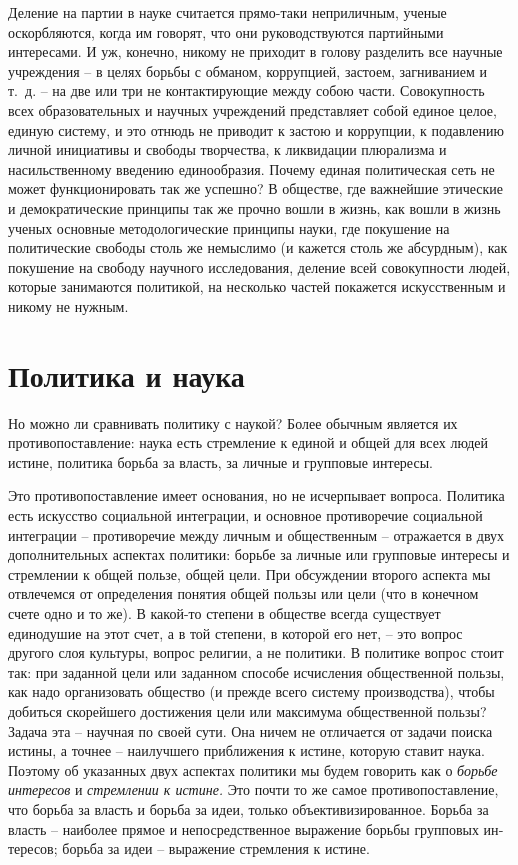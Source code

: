 \documentclass{book}
\begin{document}
Деление на партии в науке считается прямо-таки неприличным, ученые оскорбляются, когда им говорят, что они руководству­ются партийными интересами. И уж, конечно, никому не приходит в голову разделить все научные учреждения -- в целях борьбы с обманом, коррупцией, застоем, загниванием и т.~д. -- на две или три не контактирующие между собою части. Совокупность всех образовательных и научных учреждений пред­ставляет собой единое целое, единую систему, и это отнюдь не приводит к застою и коррупции, к подавлению личной ини­циативы и свободы творчества, к ликвидации плюрализма и насильственному введению единообразия. Почему единая поли­тическая сеть не может функционировать так же успешно? В обществе, где важнейшие этические и демократические прин­ципы так же прочно вошли в жизнь, как вошли в жизнь ученых основные методологические принципы науки, где покушение на политические свободы столь же немыслимо (и кажется столь же абсурдным), как покушение на свободу научного ис­следования, деление всей совокупности людей, 
которые занима­ются политикой, на несколько частей покажется искусственным и никому не нужным.



\section{Политика и наука}

Но можно ли сравнивать политику с наукой? Более обычным является их противопоставление: наука есть стремление к единой и общей для всех людей истине, политика борьба за власть, за личные и групповые интересы.

Это противопоставление имеет основания, но не исчерпывает вопроса. Политика есть искусство социальной интеграции, и основное противоречие социальной интеграции -- противоречие между личным и общественным -- отражается в двух дополнительных аспектах политики: борьбе за личные или групповые интересы и стремлении к общей пользе, общей цели. При обсуждении второго аспекта мы отвлечемся от определения понятия общей пользы или цели (что в конечном счете одно и то же). В какой-то степени в обществе всегда существует единодушие на этот счет, а в той степени, в которой его нет, -- это вопрос другого слоя культуры, вопрос религии, а не политики. В политике вопрос стоит так: при заданной цели или заданном способе исчисления общественной пользы, как надо организовать общество (и прежде всего систему производства), чтобы добиться скорейшего достижения цели или максимума общественной пользы? Задача эта -- научная по своей сути. Она ничем не отличается от задачи поиска истины, а точнее -- наилучшего приближения к истине, 
которую ставит наука. Поэтому об указанных двух аспектах политики мы будем говорить как о \textit{борьбе интересов}  и \textit{стремлении к истине.}  Это почти то же самое противопоставление, что борьба за власть и борьба за идеи, только объективизированное. Борьба за власть -- наиболее прямое и непосредственное выражение борьбы групповых ин­тересов; борьба за идеи -- выражение стремления к истине.
\end{document}
